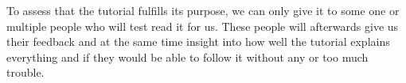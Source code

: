 
To assess that the tutorial fulfills its purpose, we can only give it
to some one or multiple people who will test read it for us. These
people will afterwards give us their feedback and at the same time
insight into how well the tutorial explains everything and if they
would be able to follow it without any or too much trouble.
